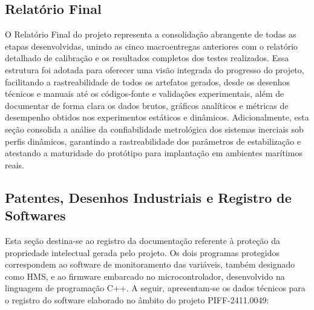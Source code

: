 \documentclass[a4paper, 12pt]{article}
\begin{document}
    \subsection{Relatório Final}
        O Relatório Final do projeto representa a consolidação abrangente de todas as etapas desenvolvidas, unindo as cinco macroentregas anteriores com o relatório detalhado de calibração e os resultados completos dos testes realizados. Essa estrutura foi adotada para oferecer uma visão integrada do progresso do projeto, facilitando a rastreabilidade de todos os artefatos gerados, desde os desenhos técnicos e manuais até os códigos-fonte e validações experimentais, além de documentar de forma clara os dados brutos, gráficos analíticos e métricas de desempenho obtidos nos experimentos estáticos e dinâmicos. Adicionalmente, esta seção consolida a análise da confiabilidade metrológica dos sistemas inerciais sob perfis dinâmicos, garantindo a rastreabilidade dos parâmetros de estabilização e atestando a maturidade do protótipo para implantação em ambientes marítimos reais.

    \subsection{Patentes, Desenhos Industriais e Registro de Softwares}
        Esta seção destina-se ao registro da documentação referente à proteção da propriedade intelectual gerada pelo projeto. Os dois programas protegidos correspondem ao software de monitoramento das variáveis, também designado como HMS, e ao firmware embarcado no microcontrolador, desenvolvido na linguagem de programação C++. A seguir, apresentam-se os dados técnicos para o registro do software elaborado no âmbito do projeto PIFF-2411.0049:
\end{document}

